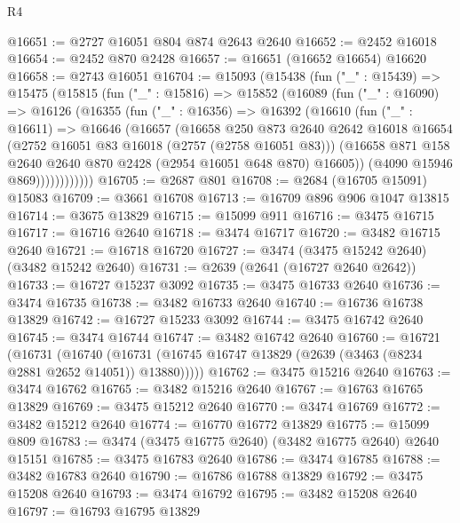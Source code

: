 \begin{lexlean}{R4}
\begin{coremodule}
@16651 := @2727 @16051 @804 @874 @2643 @2640
@16652 := @2452 @16018
@16654 := @2452 @870 @2428
@16657 := @16651 (@16652 @16654) @16620
@16658 := @2743 @16051
@16704 := @15093
    (@15438
      (fun ("_" : @15439) =>
      @15475
        (@15815
          (fun ("_" : @15816) =>
          @15852
            (@16089
              (fun ("_" : @16090) =>
              @16126
                (@16355
                  (fun ("_" : @16356) =>
                  @16392
                    (@16610
                      (fun ("_" : @16611) =>
                      @16646
                        (@16657
                          (@16658
                            @250
                            @873
                            @2640
                            @2642
                            @16018
                            @16654
                            (@2752 @16051 @83 @16018 (@2757 (@2758 @16051 @83)))
                            (@16658
                              @871
                              @158
                              @2640
                              @2640
                              @870
                              @2428
                              (@2954 @16051 @648 @870)
                              @16605))
                          (@4090 @15946 @869))))))))))))
@16705 := @2687 @801
@16708 := @2684 (@16705 @15091) @15083
@16709 := @3661 @16708
@16713 := @16709 @896 @906 @1047 @13815
@16714 := @3675 @13829
@16715 := @15099 @911
@16716 := @3475 @16715
@16717 := @16716 @2640
@16718 := @3474 @16717
@16720 := @3482 @16715 @2640
@16721 := @16718 @16720
@16727 := @3474 (@3475 @15242 @2640) (@3482 @15242 @2640)
@16731 := @2639 (@2641 (@16727 @2640 @2642))
@16733 := @16727 @15237 @3092
@16735 := @3475 @16733 @2640
@16736 := @3474 @16735
@16738 := @3482 @16733 @2640
@16740 := @16736 @16738 @13829
@16742 := @16727 @15233 @3092
@16744 := @3475 @16742 @2640
@16745 := @3474 @16744
@16747 := @3482 @16742 @2640
@16760 := @16721
    (@16731
      (@16740 (@16731 (@16745 @16747 @13829 (@2639 (@3463 (@8234 @2881 @2652 @14051)) @13880)))))
@16762 := @3475 @15216 @2640
@16763 := @3474 @16762
@16765 := @3482 @15216 @2640
@16767 := @16763 @16765 @13829
@16769 := @3475 @15212 @2640
@16770 := @3474 @16769
@16772 := @3482 @15212 @2640
@16774 := @16770 @16772 @13829
@16775 := @15099 @809
@16783 := @3474 (@3475 @16775 @2640) (@3482 @16775 @2640) @2640 @15151
@16785 := @3475 @16783 @2640
@16786 := @3474 @16785
@16788 := @3482 @16783 @2640
@16790 := @16786 @16788 @13829
@16792 := @3475 @15208 @2640
@16793 := @3474 @16792
@16795 := @3482 @15208 @2640
@16797 := @16793 @16795 @13829

\end{coremodule}
\end{lexlean}
